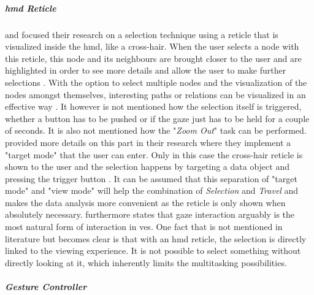 \subparagraph{\gls{hmd} Reticle}

\cite{Kwon2015} and \cite{Drouhard2015} focused their research on a selection technique using a reticle that is visualized inside the \gls{hmd}, like a cross-hair. When the user selects a node with this reticle, this node and its neighbours are brought closer to the user and are highlighted in order to see more details and allow the user to make further selections \citep{Kwon2015}. With the option to select multiple nodes and the visualization of the nodes amongst themselves, interesting paths or relations can be visualized in an effective way \citep{Kwon2015}. It however is not mentioned how the selection itself is triggered, whether a button has to be pushed or if the gaze just has to be held for a couple of seconds. It is also not mentioned how the "\textit{Zoom Out}" task can be performed. \newline
\cite{Drouhard2015} provided more details on this part in their research where they implement a "target mode" that the user can enter. Only in this case the cross-hair reticle is shown to the user and the selection happens by targeting a data object and pressing the trigger button \citep{Drouhard2015}. It can be assumed that this separation of "target mode" and "view mode" will help the combination of \textit{Selection} and \textit{Travel} and makes the data analysis more convenient as the reticle is only shown when absolutely necessary. \newline
\cite{Drouhard2015} furthermore states that gaze interaction arguably is the most natural form of interaction in \glspl{ve}. \newline
One fact that is not mentioned in literature but becomes clear is that with an \gls{hmd} reticle, the selection is directly linked to the viewing experience. It is not possible to select something without directly looking at it, which inherently limits the multitasking possibilities.


\subparagraph{Gesture Controller}

\label{HentschelFigureRef}

